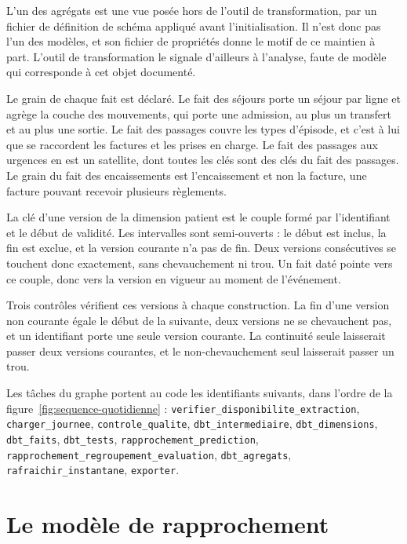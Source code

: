 L'un des agrégats est une vue posée hors de l'outil de transformation, par un fichier de définition
de schéma appliqué avant l'initialisation. Il n'est donc pas l'un des modèles, et son fichier de
propriétés donne le motif de ce maintien à part. L'outil de transformation le signale d'ailleurs à
l'analyse, faute de modèle qui corresponde à cet objet documenté.

Le grain de chaque fait est déclaré. Le fait des séjours porte un séjour par ligne et agrège la
couche des mouvements, qui porte une admission, au plus un transfert et au plus une sortie. Le fait
des passages couvre les  types d'épisode, et c'est à lui que se raccordent les factures et les
prises en charge. Le fait des passages aux urgences en est un satellite, dont toutes les clés sont
des clés du fait des passages. Le grain du fait des encaissements est l'encaissement et non la
facture, une facture pouvant recevoir plusieurs règlements.

La clé d'une version de la dimension patient est le couple formé par l'identifiant et le début de
validité. Les intervalles sont semi-ouverts : le début est inclus, la fin est exclue, et la version
courante n'a pas de fin. Deux versions consécutives se touchent donc exactement, sans chevauchement
ni trou. Un fait daté pointe vers ce couple, donc vers la version en vigueur au moment de
l'événement.

Trois contrôles vérifient ces versions à chaque construction. La fin d'une version non courante
égale le début de la suivante, deux versions ne se chevauchent pas, et un identifiant porte une
seule version courante. La continuité seule laisserait passer deux versions courantes, et le
non-chevauchement seul laisserait passer un trou.

{\raggedright Les  tâches du graphe portent au code les identifiants
suivants, dans l'ordre de la figure~\ref{fig:sequence-quotidienne} :
\texttt{verifier\_disponibilite\_extraction}, \texttt{charger\_journee}, \texttt{controle\_qualite},
\texttt{dbt\_intermediaire}, \texttt{dbt\_dimensions}, \texttt{dbt\_faits}, \texttt{dbt\_tests},
\texttt{rapprochement\_prediction}, \texttt{rapprochement\_regroupement\_evaluation},
\texttt{dbt\_agregats}, \texttt{rafraichir\_instantane}, \texttt{exporter}.\par}

\section{Le modèle de rapprochement}\label{sec:complements-modele}

